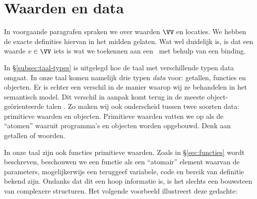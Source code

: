 \section{Waarden en data}
\label{sec:waarden}

In voorgaande paragrafen spraken we over waarden $\VV$ en locaties. We hebben de exacte definities hiervan in het midden gelaten. Wat wel duidelijk is, is dat een waarde $v \in \VV$ iets is wat we toekennen aan een \Id\ met behulp van een binding.

In §\ref{subsec:taal-types} is uitgelegd hoe de taal met verschillende typen data omgaat. In onze taal komen namelijk drie typen \emph{data} voor: getallen, functies en objecten. Er is echter een verschil in de manier waarop wij ze behandelen in het semantisch model. Dit verschil in aanpak komt terug in de meeste object-geörienteerde talen \citep{java,csharp}.
Zo maken wij ook onderscheid tussen twee soorten data: primitieve waarden en objecten. Primitieve waarden vatten we op als de “atomen” waaruit programma's en objecten worden opgebouwd. Denk aan getallen of woorden.

\begin{NoBreak}
  \codeFragmentCaption
\end{NoBreak}

In onze taal zijn ook functies primitieve waarden. Zoals in §\ref{sec:functies} wordt beschreven, beschouwen we een functie als een “atomair” element waarvan de parameters, mogelijkerwijs een teruggeef variabele, code en bereik van definitie bekend zijn. Ondanks dat dit een hoop informatie is, is het slechts een bouwsteen van complexere structuren. Het volgende voorbeeld illustreert deze gedachte:

\begin{NoBreak}
  \codeFragmentCaption
\end{NoBreak}

